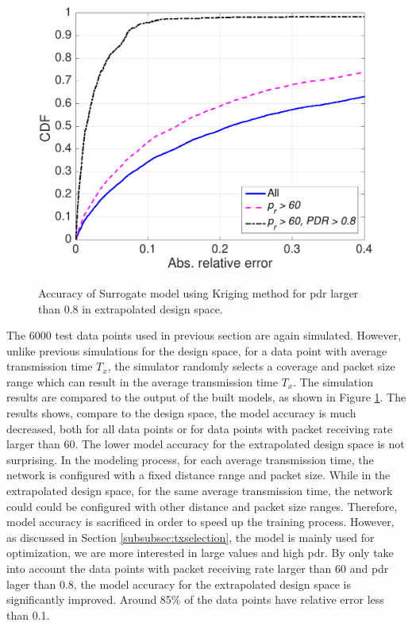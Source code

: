  
 \begin{figure}[t]
    \centering
{\includegraphics[width=0.8\columnwidth]{figures/Extend_constraint_09}}
  \caption{Accuracy of Surrogate model using Kriging method for \gls{pdr} larger than 0.8 in extrapolated design space. \label{fig:cdf_constraint_extended}}
\end{figure}
 
The 6000 test data points used in previous section are again simulated. However, unlike previous simulations for the design space, for a data point with average transmission time $T_x$, the simulator randomly selects a  coverage and packet size range which can result in the average transmission time $T_x$. The simulation results are compared to the output of the built models, as shown in Figure \ref{fig:cdf_constraint_extended}. The results shows, compare to the design space, the model accuracy is much decreased,  both for all data points or for data points with packet receiving rate larger than 60. The lower model accuracy for the extrapolated design space is not surprising. In the modeling process, for each average transmission time, the network is configured with a fixed distance range and packet size. While in the extrapolated design space, for the same average transmission time, the network could could be configured with other distance  and packet size ranges. Therefore, model accuracy is sacrificed in order to speed up the training process. However, as discussed in Section \ref{subsubsec:txselection}, the model is mainly used for optimization, we are more interested in large values and high \gls{pdr}. By only take into account the data points with packet receiving rate larger than 60 and \gls{pdr} lager than 0.8, the model accuracy for the extrapolated design space is significantly improved. Around 85\% of the data points have relative error less than 0.1. 

